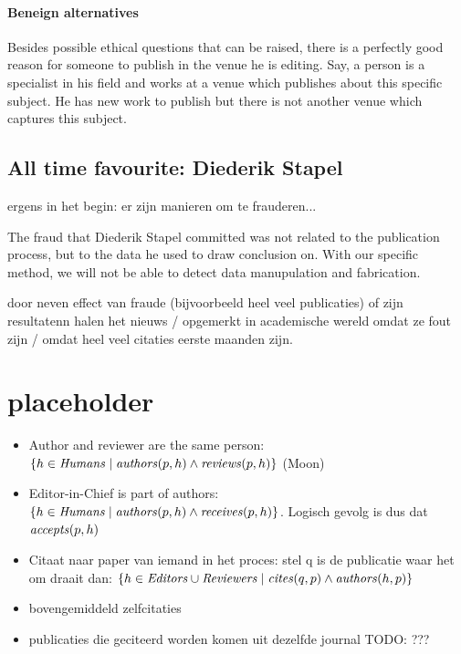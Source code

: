 \documentclass{ou-report}
\newcommand{\todo}[1]{{\color{red} TODO: #1}}
\newcommand{\outline}[1]{{\color{blue} #1}}
\begin{document}
\paragraph{Beneign alternatives}
Besides possible ethical questions that can be raised, there is a perfectly good
reason for someone to publish in the venue he is editing. Say, a person is a 
specialist in his field and works at a venue which publishes about this 
specific subject. He has new work to publish but there is not another venue 
which captures this subject.


\subsection{All time favourite: Diederik Stapel}
\outline{ergens in het begin: er zijn manieren om te frauderen...}

The fraud that Diederik Stapel committed was not related to the publication 
process, but to the data he used to draw conclusion on.
With our specific method, we will not be able to detect data manupulation and
fabrication.

\outline{door neven effect van fraude (bijvoorbeeld heel veel publicaties) of zijn resultatenn halen het nieuws / opgemerkt in academische wereld omdat ze fout zijn / omdat heel veel citaties eerste maanden zijn}.


\outline{
\section{placeholder}

\begin{itemize}
    \item Author and reviewer are the same person: $\{h \in \mathit{Humans} \mid \mathit{authors}(p, h) \land \mathit{reviews}(p, h)\}$ (Moon)
    \item Editor-in-Chief is part of authors: $\{h \in \mathit{Humans} \mid \mathit{authors}(p, h) \land \mathit{receives}(p, h)\}$. Logisch gevolg is dus dat $\mathit{accepts}(p, h)$
    \item Citaat naar paper van iemand in het proces: stel q is de publicatie waar het om draait dan:
    $\{h \in \mathit{Editors} \cup \mathit{Reviewers} \mid \mathit{cites}(q, p) \land \mathit{authors}(h, p)\}$
    \item bovengemiddeld zelfcitaties
    \item publicaties die geciteerd worden komen uit dezelfde journal\todo{???}
\end{itemize}
}
\end{document}
